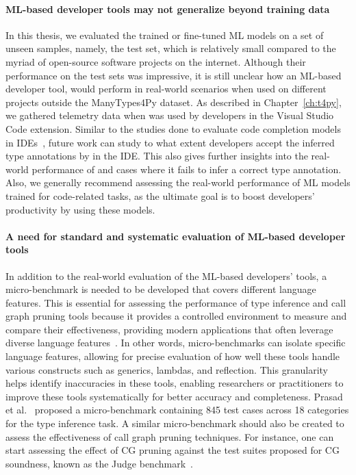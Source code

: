 \paragraph{ML-based developer tools may not generalize beyond training data} In this thesis, we evaluated the trained or fine-tuned ML models on a set of unseen samples, namely, the test set, which is relatively small compared to the myriad of open-source software projects on the internet. Although their performance on the test sets was impressive, it is still unclear how an ML-based developer tool,  would perform in real-world scenarios when used on different projects outside the ManyTypes4Py dataset. As described in Chapter~\ref{ch:t4py}, we gathered telemetry data when  was used by developers in the Visual Studio Code extension. Similar to the studies done to evaluate code completion models in IDEs~\cite{izadi2024language, hellendoorn2019code}, future work can study to what extent developers accept the inferred type annotations by  in the IDE. This also gives further insights into the real-world performance of  and cases where it fails to infer a correct type annotation. Also, we generally recommend assessing the real-world performance of ML models trained for code-related tasks, as the ultimate goal is to boost developers' productivity by using these models.

\paragraph{A need for standard and systematic evaluation of ML-based developer tools} In addition to the real-world evaluation of the ML-based developers' tools, a micro-benchmark is needed to be developed that covers different language features. This is essential for assessing the performance of type inference and call graph pruning tools because it provides a controlled environment to measure and compare their effectiveness, providing modern applications that often leverage diverse language features~\cite{peng2021empirical}. In other words, micro-benchmarks can isolate specific language features, allowing for precise evaluation of how well these tools handle various constructs such as generics, lambdas, and reflection. This granularity helps identify inaccuracies in these tools, enabling researchers or practitioners to improve these tools systematically for better accuracy and completeness. Prasad et al.~\cite{venkatesh2023typeevalpy} proposed a micro-benchmark containing 845 test cases across 18 categories for the type inference task. A similar micro-benchmark should also be created to assess the effectiveness of call graph pruning techniques. For instance, one can start assessing the effect of CG pruning against the test suites proposed for CG soundness, known as the Judge benchmark~\cite{reif2019judge}.

